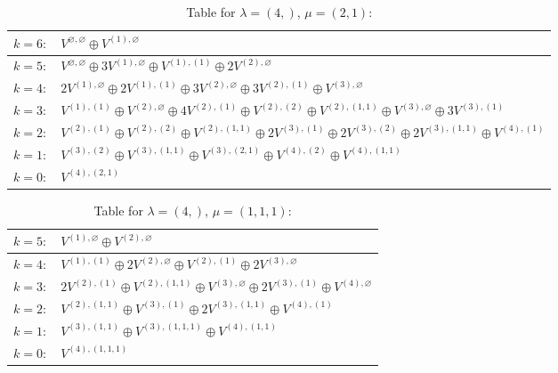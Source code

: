 \documentclass[a4paper,12pt]{article}
\begin{document}
\renewcommand{\arraystretch}{1.6} 
\begin{table}[H]
\centering
\caption{Table for $\lambda = (4,)$, $\mu = (2, 1)$:}
\begin{tabular}{|>{\centering\arraybackslash}p{15cm}|}
\hline
 $k = 6: \quad V^{\varnothing, \varnothing} \oplus V^{(1), \varnothing} $ \\ \hline
 $k = 5: \quad V^{\varnothing, \varnothing} \oplus 3 V^{(1), \varnothing} \oplus V^{(1), (1)} \oplus 2 V^{(2), \varnothing} $ \\ \hline
 $k = 4: \quad 2 V^{(1), \varnothing} \oplus 2 V^{(1), (1)} \oplus 3 V^{(2), \varnothing} \oplus 3 V^{(2), (1)} \oplus V^{(3), \varnothing} $ \\ \hline
 $k = 3: \quad V^{(1), (1)} \oplus V^{(2), \varnothing} \oplus 4 V^{(2), (1)} \oplus V^{(2), (2)} \oplus V^{(2), (1, 1)} \oplus V^{(3), \varnothing} \oplus 3 V^{(3), (1)} $ \\ \hline
 $k = 2: \quad V^{(2), (1)} \oplus V^{(2), (2)} \oplus V^{(2), (1, 1)} \oplus 2 V^{(3), (1)} \oplus 2 V^{(3), (2)} \oplus 2 V^{(3), (1, 1)} \oplus V^{(4), (1)} $ \\ \hline
 $k = 1: \quad V^{(3), (2)} \oplus V^{(3), (1, 1)} \oplus V^{(3), (2, 1)} \oplus V^{(4), (2)} \oplus V^{(4), (1, 1)} $ \\ \hline
 $k = 0: \quad V^{(4), (2, 1)} $ \\ \hline
\end{tabular}
\end{table}

\renewcommand{\arraystretch}{1.6} 
\begin{table}[H]
\centering
\caption{Table for $\lambda = (4,)$, $\mu = (1, 1, 1)$:}
\begin{tabular}{|>{\centering\arraybackslash}p{15cm}|}
\hline
 $k = 5: \quad V^{(1), \varnothing} \oplus V^{(2), \varnothing} $ \\ \hline
 $k = 4: \quad V^{(1), (1)} \oplus 2 V^{(2), \varnothing} \oplus V^{(2), (1)} \oplus 2 V^{(3), \varnothing} $ \\ \hline
 $k = 3: \quad 2 V^{(2), (1)} \oplus V^{(2), (1, 1)} \oplus V^{(3), \varnothing} \oplus 2 V^{(3), (1)} \oplus V^{(4), \varnothing} $ \\ \hline
 $k = 2: \quad V^{(2), (1, 1)} \oplus V^{(3), (1)} \oplus 2 V^{(3), (1, 1)} \oplus V^{(4), (1)} $ \\ \hline
 $k = 1: \quad V^{(3), (1, 1)} \oplus V^{(3), (1, 1, 1)} \oplus V^{(4), (1, 1)} $ \\ \hline
 $k = 0: \quad V^{(4), (1, 1, 1)} $ \\ \hline
\end{tabular}
\end{table}
\end{document}
